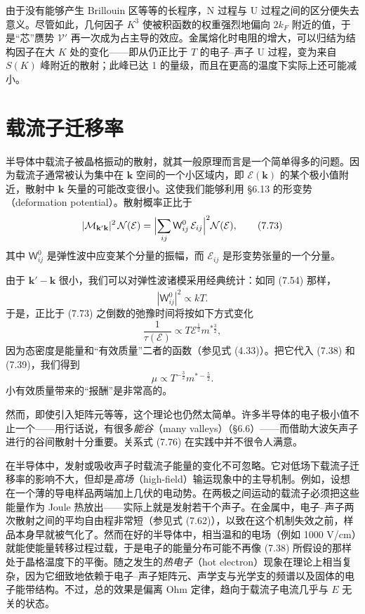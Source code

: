由于没有能够产生 Brillouin 区等等的长程序，N 过程与 U 过程之间的区分便失去意义。尽管如此，几何因子 $K^{3}$ 使被积函数的权重强烈地偏向 $2k_{F}$ 附近的值，于是“芯”赝势 $\mathcal{V}'$ 再一次成为占主导的效应。金属熔化时电阻的增大，可以归结为结构因子在大 $K$ 处的变化——即从仍正比于 $T$ 的电子--声子 U 过程，变为来自 $S(K)$ 峰附近的散射；此峰已达 1 的量级，而且在更高的温度下实际上还可能减小。

\section{载流子迁移率}

半导体中载流子被晶格振动的散射，就其一般原理而言是一个简单得多的问题。因为载流子通常被认为集中在 $\mathbf{k}$ 空间的一个小区域内，即 $\mathcal{E}(\mathbf{k})$ 的某个极小值附近，散射中 $\mathbf{k}$ 矢量的可能改变很小。这使我们能够利用 §6.13 的形变势（deformation potential）。散射概率正比于
\begin{equation*}
|\mathcal{M}_{\mathbf{k}'\mathbf{k}}|^{2}\,\mathcal{N}(\mathcal{E})=\Bigl|\sum_{ij}\mathsf{W}^{0}_{ij}\,\mathcal{E}_{ij}\Bigr|^{2}\mathcal{N}(\mathcal{E}),\tag{7.73}
\end{equation*}
其中 $\mathsf{W}^{0}_{ij}$ 是弹性波中应变某个分量的振幅，而 $\mathcal{E}_{ij}$ 是形变势张量的一个分量。

由于 $\mathbf{k}'-\mathbf{k}$ 很小，我们可以对弹性波诸模采用经典统计：如同 (7.54) 那样，
\begin{equation*}
\overline{|\mathsf{W}^{0}_{ij}|^{2}}\propto kT.\tag{7.74}
\end{equation*}
于是，正比于 (7.73) 之倒数的弛豫时间将按如下方式变化
\begin{equation*}
\frac{1}{\tau(\mathcal{E})}\propto T\mathcal{E}^{\frac{1}{2}}m^{*\frac{3}{2}},\tag{7.75}
\end{equation*}
因为态密度是能量和“有效质量”二者的函数（参见式 (4.33)）。把它代入 (7.38) 和 (7.39)，我们得到
\begin{equation*}
\mu\propto T^{-\frac{3}{2}}m^{*-\frac{5}{2}}.\tag{7.76}
\end{equation*}
小有效质量带来的“报酬”是非常高的。

然而，即使引入矩阵元等等，这个理论也仍然太简单。许多半导体的电子极小值不止一个——用行话说，有很多\emph{能谷}（many valleys）（§6.6）——而借助大波矢声子进行的谷间散射十分重要。关系式 (7.76) 在实践中并不很令人满意。

在半导体中，发射或吸收声子时载流子能量的变化不可忽略。它对低场下载流子迁移率的影响不大，但却是\emph{高场}（high-field）输运现象中的主导机制。例如，设想在一个薄的导电样品两端加上几伏的电动势。在两极之间运动的载流子必须把这些能量作为 Joule 热放出——实际上就是发射若干个声子。在金属中，电子--声子两次散射之间的平均自由程非常短（参见式 (7.62)），以致在这个机制失效之前，样品本身早就被气化了。然而在好的半导体中，相当温和的电场（例如 1000 V/cm）就能使能量转移过程过载，于是电子的能量分布可能不再像 (7.38) 所假设的那样处于晶格温度下的平衡。随之发生的\emph{热电子}（hot electron）现象在理论上相当复杂，因为它细致地依赖于电子--声子矩阵元、声学支与光学支的频谱以及固体的电子能带结构。不过，总的效果是偏离 Ohm 定律，趋向于载流子电流几乎与 $E$ 无关的状态。


